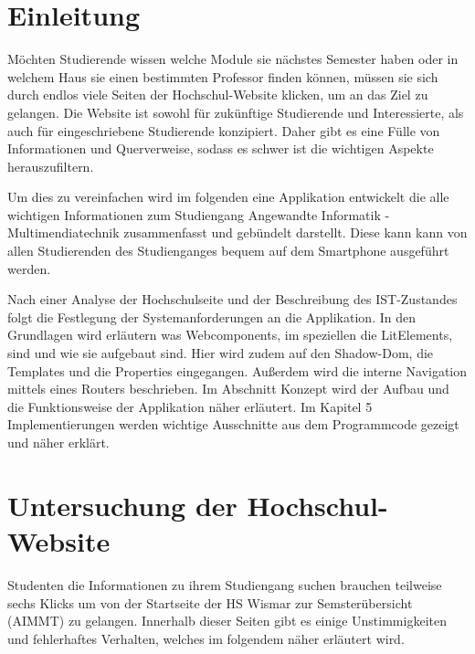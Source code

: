 \documentclass[12pt,					%
							 oneside,			%
							 a4paper,			%
							 halfparskip,		%
							 liststotoc,			%
							 bibtotoc,			%
							 fleqn,				%
							 pointlessnumbers]	%
							 {scrreprt}
\newcommand{\blankpage}{
	\newpage
	\thispagestyle{empty}
	\mbox{}
	\newpage
}
\begin{document}
	\onehalfspacing 					%
	
	\tableofcontents					%


\newpage

\chapter{Einleitung}
Möchten Studierende wissen welche Module sie nächstes Semester haben oder in welchem Haus sie einen bestimmten Professor finden können, müssen sie sich durch endlos viele Seiten der Hochschul-Website klicken, um an das Ziel zu gelangen. Die Website ist sowohl für zukünftige Studierende und Interessierte, als auch für eingeschriebene Studierende konzipiert. Daher gibt es eine Fülle von Informationen und Querverweise, sodass es schwer ist die wichtigen Aspekte herauszufiltern.

Um dies zu vereinfachen wird im folgenden eine Applikation entwickelt die alle wichtigen Informationen zum Studiengang Angewandte Informatik - Multimendiatechnik zusammenfasst und gebündelt darstellt. Diese kann kann von allen Studierenden des Studienganges bequem auf dem Smartphone ausgeführt werden.

Nach einer Analyse der Hochschulseite und der Beschreibung des IST-Zustandes folgt die Festlegung der Systemanforderungen an die Applikation. In den Grundlagen wird erläutern was Webcomponents, im speziellen die LitElements, sind und wie sie aufgebaut sind. Hier wird zudem auf den Shadow-Dom, die Templates und die Properties eingegangen. Außerdem wird die interne Navigation mittels eines Routers beschrieben. Im Abschnitt Konzept wird der Aufbau und die Funktionsweise der Applikation näher erläutert. Im Kapitel 5 Implementierungen werden wichtige Ausschnitte aus dem Programmcode gezeigt und näher erklärt.

\chapter{Untersuchung der Hochschul-Website}	
Studenten die Informationen zu ihrem Studiengang suchen brauchen teilweise sechs Klicks um von der Startseite der HS Wismar zur Semsterübersicht (AIMMT) zu gelangen. Innerhalb dieser Seiten gibt es einige Unstimmigkeiten und fehlerhaftes Verhalten, welches im folgendem näher erläutert wird.
\end{document}
